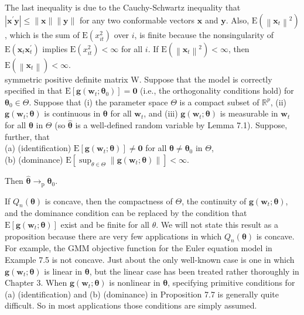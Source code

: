 \documentclass[10pt]{article}
\begin{document}
The last inequality is due to the Cauchy-Schwartz inequality that $\left|\mathbf{x}^{\prime} \mathbf{y}\right| \leq\|\mathbf{x}\|\|\mathbf{y}\|$ for any two conformable vectors $\mathbf{x}$ and $\mathbf{y}$. Also, $\mathrm{E}\left(\left\|\mathbf{x}_{t}\right\|^{2}\right)$, which is the sum of $\mathrm{E}\left(x_{i t}^{2}\right)$ over $i$, is finite because the nonsingularity of $\mathrm{E}\left(\mathbf{x}_{t} \mathbf{x}_{t}^{\prime}\right)$ implies $\mathrm{E}\left(x_{i t}^{2}\right)<\infty$ for all $i$. If $\mathrm{E}\left(\left\|\mathbf{x}_{t}\right\|^{2}\right)<\infty$, then $\mathrm{E}\left(\left\|\mathbf{x}_{t}\right\|\right)<\infty$.\\
symmetric positive definite matrix W. Suppose that the model is correctly specified in that $\mathrm{E}\left[\mathbf{g}\left(\mathbf{w}_{t} ; \boldsymbol{\theta}_{0}\right)\right]=\mathbf{0}$ (i.e., the orthogonality conditions hold) for $\boldsymbol{\theta}_{0} \in \Theta$. Suppose that (i) the parameter space $\Theta$ is a compact subset of $\mathbb{R}^{p}$, (ii) $\mathbf{g}\left(\mathbf{w}_{t} ; \boldsymbol{\theta}\right)$ is continuous in $\boldsymbol{\theta}$ for all $\mathbf{w}_{t}$, and (iii) $\mathbf{g}\left(\mathbf{w}_{t} ; \boldsymbol{\theta}\right)$ is measurable in $\mathbf{w}_{t}$ for all $\boldsymbol{\theta}$ in $\Theta$ (so $\hat{\boldsymbol{\theta}}$ is a well-defined random variable by Lemma 7.1). Suppose, further, that\\
(a) (identification) $\mathrm{E}\left[\mathbf{g}\left(\mathbf{w}_{t} ; \boldsymbol{\theta}\right)\right] \neq \mathbf{0}$ for all $\boldsymbol{\theta} \neq \boldsymbol{\theta}_{0}$ in $\Theta$,\\
(b) (dominance) $\mathrm{E}\left[\sup _{\theta \in \Theta}\left\|\mathbf{g}\left(\mathbf{w}_{t} ; \boldsymbol{\theta}\right)\right\|\right]<\infty$.

Then $\hat{\boldsymbol{\theta}} \rightarrow_{\mathrm{p}} \boldsymbol{\theta}_{0}$.

If $Q_{n}(\boldsymbol{\theta})$ is concave, then the compactness of $\Theta$, the continuity of $\mathbf{g}\left(\mathbf{w}_{t} ; \boldsymbol{\theta}\right)$, and the dominance condition can be replaced by the condition that $\mathrm{E}\left[\mathbf{g}\left(\mathbf{w}_{t} ; \boldsymbol{\theta}\right)\right]$ exist and be finite for all $\theta$. We will not state this result as a proposition because there are very few applications in which $Q_{n}(\boldsymbol{\theta})$ is concave. For example, the GMM objective function for the Euler equation model in Example 7.5 is not concave. Just about the only well-known case is one in which $\mathbf{g}\left(\mathbf{w}_{t} ; \boldsymbol{\theta}\right)$ is linear in $\boldsymbol{\theta}$, but the linear case has been treated rather thoroughly in Chapter 3. When $\mathbf{g}\left(\mathbf{w}_{t} ; \boldsymbol{\theta}\right)$ is nonlinear in $\boldsymbol{\theta}$, specifying primitive conditions for (a) (identification) and (b) (dominance) in Proposition 7.7 is generally quite difficult. So in most applications those conditions are simply assumed.
\end{document}
